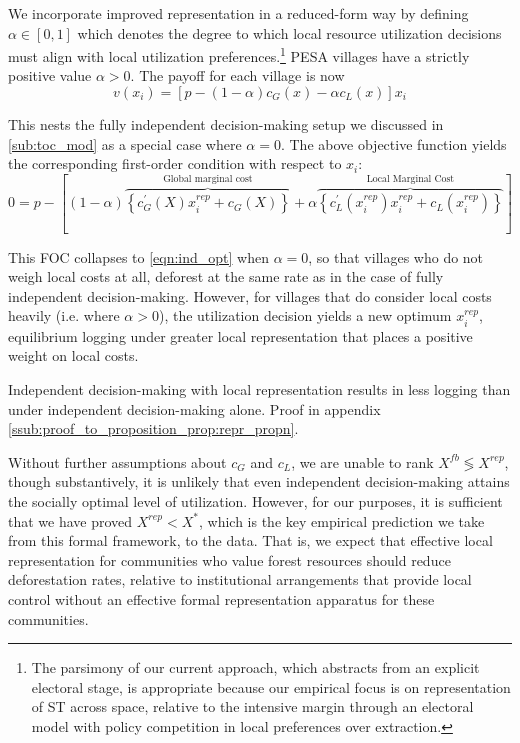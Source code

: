 \documentclass[12pt,reqno]{article}
\newcommand{\Obr}[2]{ \overbrace{#1}^{\text{#2}}}
\begin{document}
We incorporate improved representation in a reduced-form way by defining $\alpha \in [0, 1]$ which denotes the degree to which local resource utilization decisions must align with local utilization preferences.\footnote{The parsimony of our current approach, which abstracts from an explicit electoral stage, is appropriate because our empirical focus is on representation of ST across space, relative to the intensive margin through an electoral model with policy competition in local preferences over extraction.} PESA villages have a strictly positive value $\alpha > 0$. The payoff for each village is now
\begin{equation}
 v(x_i) = \left[p- (1-\alpha) c_G(x)- \alpha c_L(x)\right] x_{i}
 \label{eqn:vil_prob2}
\end{equation}

\noindent This nests the fully independent decision-making setup we discussed in \ref{sub:toc_mod} as a special case where $\alpha = 0$.  The above objective function yields  the corresponding first-order condition with respect to $x_i$:
\begin{equation}
0 = p-\left[
    (1-\alpha)\Obr{
        \left\{c_G^{\prime}(X) x_{i}^{rep}+c_G(X) \right\}}{Global marginal cost} +
    \alpha
    \Obr{
        \left\{c_L^{\prime}(x_{i}^{rep}) x_{i}^{rep}+
        c_L(x_{i}^{rep})\right\}}{Local Marginal Cost}
    \right]
\end{equation}

This FOC collapses to \ref{eqn:ind_opt} when $\alpha = 0$, so that villages who do not weigh local costs at all, deforest at the same rate as in the case of fully independent decision-making. However, for villages that do consider local costs heavily (i.e. where $\alpha > 0$), the utilization decision yields a new optimum $x_i^{rep}$, equilibrium logging under greater local representation that places a positive weight on local costs.

\begin{propn}[$X^{rep} < X^{*}$]\label{prop:repr_propn} Independent decision-making with local representation results in less logging than under independent decision-making alone. 
Proof in appendix \ref{ssub:proof_to_proposition_prop:repr_propn}.
\end{propn}

Without further assumptions about $c_G$ and $c_L$, we are unable to rank $X^{fb} \lessgtr X^{rep}$, though substantively, it is unlikely that even independent decision-making attains the socially optimal level of utilization. However, for our purposes, it is sufficient that we have proved $X^{rep} < X^{*}$, which is the key empirical prediction we take from this formal framework, to the data. That is, we expect that effective local representation for communities who value forest resources should reduce deforestation rates, relative to institutional arrangements that provide local control without an effective formal representation apparatus for these communities. 
\end{document}
